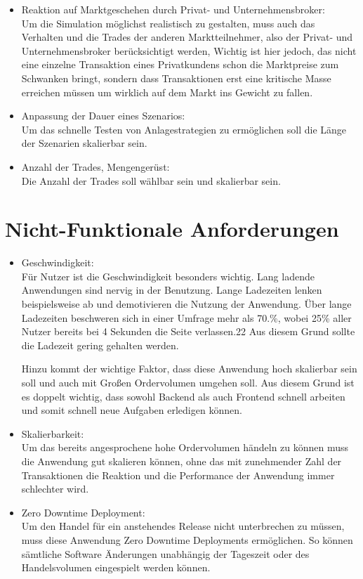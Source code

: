 \begin{itemize}
		\item Reaktion auf Marktgeschehen durch Privat- und Unternehmensbroker: \\
			Um die Simulation möglichst realistisch zu gestalten, muss auch das Verhalten und die Trades der anderen Marktteilnehmer, also der Privat- und Unternehmensbroker berücksichtigt werden, Wichtig ist hier jedoch, das nicht eine einzelne Transaktion eines Privatkundens schon die Marktpreise zum Schwanken bringt, sondern dass Transaktionen erst eine kritische Masse erreichen müssen um wirklich auf dem Markt ins Gewicht zu fallen. 
			
		\item Anpassung der Dauer eines Szenarios: \\
			Um das schnelle Testen von Anlagestrategien zu ermöglichen soll die Länge der Szenarien skalierbar sein. 
			
		\item Anzahl der Trades, Mengengerüst: \\
			Die Anzahl der Trades soll wählbar sein und skalierbar sein. 
	\end{itemize}
\section{Nicht-Funktionale Anforderungen}
		\begin{itemize}
		\item Geschwindigkeit: \\
			Für Nutzer ist die Geschwindigkeit besonders wichtig. Lang ladende Anwendungen
			sind nervig in der Benutzung. Lange Ladezeiten lenken beispielsweise
			ab und demotivieren die Nutzung der Anwendung. Über lange Ladezeiten
			beschweren sich in einer Umfrage mehr als 70.\%, wobei 25\% aller Nutzer bereits bei 4
			Sekunden die Seite verlassen.22 Aus diesem Grund sollte die Ladezeit gering gehalten
			werden. %
			
			Hinzu kommt der wichtige Faktor, dass diese Anwendung hoch skalierbar sein soll und auch mit Großen Ordervolumen umgehen soll. Aus diesem Grund ist es doppelt wichtig, dass sowohl Backend als auch Frontend schnell arbeiten und somit schnell neue Aufgaben erledigen können.
			
		\item Skalierbarkeit: \\
			Um das bereits angesprochene hohe Ordervolumen händeln zu können muss die Anwendung gut skalieren können, ohne das mit zunehmender Zahl der Transaktionen die Reaktion und die Performance der Anwendung immer schlechter wird. 
			
		\item Zero Downtime Deployment: \\
			Um den Handel für ein anstehendes Release nicht unterbrechen zu müssen, muss diese Anwendung Zero Downtime Deployments ermöglichen. So können sämtliche Software Änderungen unabhängig der Tageszeit oder des Handelsvolumen eingespielt werden können. 
	\end{itemize}
